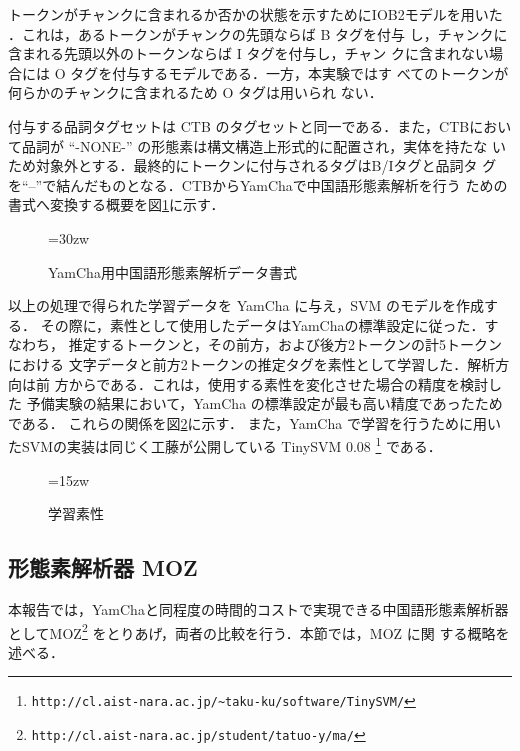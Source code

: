 トークンがチャンクに含まれるか否かの状態を示すためにIOB2モデルを用いた
\cite{Sang99}．これは，あるトークンがチャンクの先頭ならば B タグを付与
し，チャンクに含まれる先頭以外のトークンならば I タグを付与し，チャン
クに含まれない場合には O タグを付与するモデルである．一方，本実験ではす
べてのトークンが何らかのチャンクに含まれるため O タグは用いられ
ない．

付与する品詞タグセットは CTB のタグセットと同一である．また，CTBにおい
て品詞が ``-NONE-'' の形態素は構文構造上形式的に配置され，実体を持たな
いため対象外とする．最終的にトークンに付与されるタグはB/Iタグと品詞タ
グを``--''で結んだものとなる．CTBからYamChaで中国語形態素解析を行う
ための書式へ変換する概要を図\ref{YamChaFormat}に示す．

\begin{figure}[htb]
\begin{center}
\epsfxsize=30zw
\caption{YamCha用中国語形態素解析データ書式}
\label{YamChaFormat}
\end{center}
\end{figure}

以上の処理で得られた学習データを YamCha に与え，SVM のモデルを作成する．
その際に，素性として使用したデータはYamChaの標準設定に従った．すなわち，
推定するトークンと，その前方，および後方2トークンの計5トークンにおける
文字データと前方2トークンの推定タグを素性として学習した．解析方向は前
方からである．これは，使用する素性を変化させた場合の精度を検討した
予備実験の結果において，YamCha の標準設定が最も高い精度であったためである．
これらの関係を図\ref{features}に示す．
また，YamCha で学習を行うために用いたSVMの実装は同じく工藤が公開している
TinySVM 0.08
\footnote{\tt http://cl.aist-nara.ac.jp/\~{ }taku-ku/software/TinySVM/}
である．

\begin{figure}[htb]
\begin{center}
\epsfxsize=15zw
\end{center}
\caption{学習素性}
\label{features}
\end{figure}


\subsection{形態素解析器 MOZ}

本報告では，YamChaと同程度の時間的コストで実現できる中国語形態素解析器
としてMOZ\footnote{\tt http://cl.aist-nara.ac.jp/student/tatuo-y/ma/}
\cite{Yamasita2000}をとりあげ，両者の比較を行う．本節では，MOZ に関
する概略を述べる．

